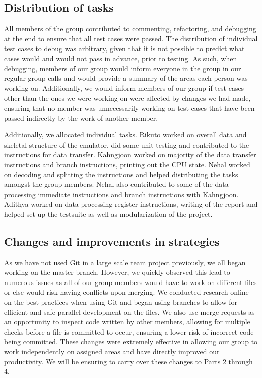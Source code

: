 \documentclass[11pt, a4paper]{article}
\begin{document}
  \subsection{Distribution of tasks}
  All members of the group contributed to commenting, refactoring, and debugging at the end to ensure that all test cases were passed. The distribution of individual test cases to debug was arbitrary, given that it is not possible to predict what cases would and would not pass in advance, prior to testing. As such, when debugging, members of our group would inform everyone in the group in our regular group calls and would provide a summary of the areas each person was working on. Additionally, we would inform members of our group if test cases other than the ones we were working on were affected by changes we had made, ensuring that no member was unnecessarily working on test cases that have been passed indirectly by the work of another member.
  
  Additionally, we allocated individual tasks. Rikuto worked on overall data and skeletal structure of the emulator, did some unit testing and contributed to the instructions for data transfer. Kahngjoon worked on majority of the data transfer instructions and branch instructions, printing out the CPU state. Nehal worked on decoding and splitting the instructions and helped distributing the tasks amongst the group members. Nehal also contributed to some of the data processing immediate instructions and branch instructions with Kahngjoon. Adithya worked on data processing register instructions, writing of the report and helped set up the testsuite as well as modularization of the project. 
  

  \subsection{Changes and improvements in strategies}
  As we have not used Git in a large scale team project previously, we all began working on the master branch. However, we quickly observed this lead to numerous issues as all of our group members would have to work on different files or else would risk having conflicts upon merging. We conducted research online on the best practices when using Git and began using branches to allow for efficient and safe parallel development on the files. We also use merge requests as an opportunity to inspect code written by other members, allowing for multiple checks before a file is committed to occur, ensuring a lower risk of incorrect code being committed. These changes were extremely effective in allowing our group to work independently on assigned areas and have directly improved our productivity. We will be ensuring to carry over these changes to Parts 2 through 4.
  
\end{document}
